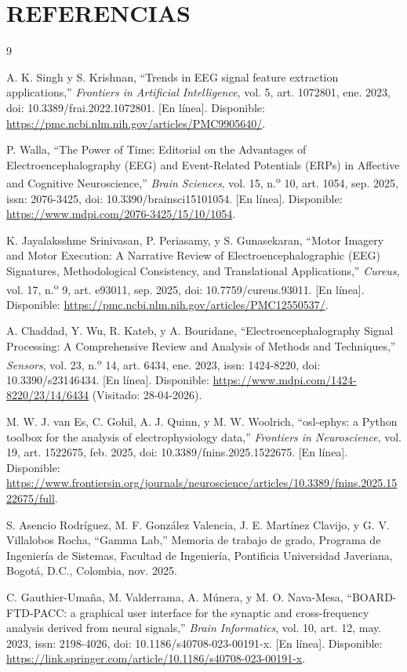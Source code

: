 \documentclass[12pt,letterpaper,oneside]{article}
\newcommand{\capitulo}[1]{\clearpage\section{#1}}
\begin{document}
\capitulo{REFERENCIAS}

\begin{thebibliography}{9}

A. K. Singh y S. Krishnan, ``Trends in EEG signal feature extraction applications,'' \textit{Frontiers in Artificial Intelligence}, vol. 5, art. 1072801, ene. 2023, doi: 10.3389/frai.2022.1072801. [En línea]. Disponible: \url{https://pmc.ncbi.nlm.nih.gov/articles/PMC9905640/}.

P. Walla, ``The Power of Time: Editorial on the Advantages of Electroencephalography (EEG) and Event-Related Potentials (ERPs) in Affective and Cognitive Neuroscience,'' \textit{Brain Sciences}, vol. 15, n.\textsuperscript{o} 10, art. 1054, sep. 2025, issn: 2076-3425, doi: 10.3390/brainsci15101054. [En línea]. Disponible: \url{https://www.mdpi.com/2076-3425/15/10/1054}.

K. Jayalaksshme Srinivasan, P. Periasamy, y S. Gunasekaran, ``Motor Imagery and Motor Execution: A Narrative Review of Electroencephalographic (EEG) Signatures, Methodological Consistency, and Translational Applications,'' \textit{Cureus}, vol. 17, n.\textsuperscript{o} 9, art. e93011, sep. 2025, doi: 10.7759/cureus.93011. [En línea]. Disponible: \url{https://pmc.ncbi.nlm.nih.gov/articles/PMC12550537/}.

A. Chaddad, Y. Wu, R. Kateb, y A. Bouridane, ``Electroencephalography Signal Processing: A Comprehensive Review and Analysis of Methods and Techniques,'' \textit{Sensors}, vol. 23, n.\textsuperscript{o} 14, art. 6434, ene. 2023, issn: 1424-8220, doi: 10.3390/s23146434. [En línea]. Disponible: \url{https://www.mdpi.com/1424-8220/23/14/6434} (Visitado: 28-04-2026).

M. W. J. van Es, C. Gohil, A. J. Quinn, y M. W. Woolrich, ``osl-ephys: a Python toolbox for the analysis of electrophysiology data,'' \textit{Frontiers in Neuroscience}, vol. 19, art. 1522675, feb. 2025, doi: 10.3389/fnins.2025.1522675. [En línea]. Disponible: \url{https://www.frontiersin.org/journals/neuroscience/articles/10.3389/fnins.2025.1522675/full}.

S. Asencio Rodríguez, M. F. González Valencia, J. E. Martínez Clavijo, y G. V. Villalobos Rocha, ``Gamma Lab,'' Memoria de trabajo de grado, Programa de Ingeniería de Sistemas, Facultad de Ingeniería, Pontificia Universidad Javeriana, Bogotá, D.C., Colombia, nov. 2025.

C. Gauthier-Umaña, M. Valderrama, A. Múnera, y M. O. Nava-Mesa, ``BOARD-FTD-PACC: a graphical user interface for the synaptic and cross-frequency analysis derived from neural signals,'' \textit{Brain Informatics}, vol. 10, art. 12, may. 2023, issn: 2198-4026, doi: 10.1186/s40708-023-00191-x. [En línea]. Disponible: \url{https://link.springer.com/article/10.1186/s40708-023-00191-x}.

\end{thebibliography}
\end{document}
